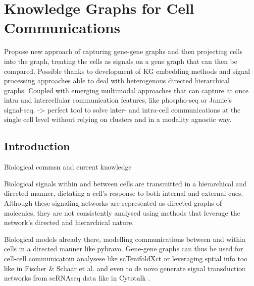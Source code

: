 \chapter{Knowledge Graphs for Cell Communications}
\label{06kg}

Propose new approach of capturing gene-gene graphs and then projecting cells into the graph, treating the cells as signals on a gene graph that can then be compared. 
Possible thanks to development of KG embedding methods and signal processing approaches able to deal with heterogenous directed hierarchical graphs. 
Coupled with emerging multimodal approaches that can capture at once intra and intercellular communication features, like phospho-seq \cite{blair_phospho-seq_2023} or Jamie's signal-seq. -> perfect tool to solve inter- and intra-cell communications at the single cell level without relying on clusters and in a modality agnostic way. 


\section{Introduction}

Biological commsn and current knowledge

Biological signals within and between cells are transmitted in a hierarchical and directed manner, dictating a cell’s response to both internal and external cues. Although these signaling networks are represented as directed graphs of molecules, they are not consistently analysed using methods that leverage the network’s directed and hierarchical nature. 


Biological models already there, modelling communications between and within cells in a directed manner like pybravo\cite{lefebvre_large-scale_2021}. Gene-gene graphs can thus be used for cell-cell communicatoin analysese like scTenifoldXct \cite{yang_sctenifoldxct_2023} or leveraging sptial info too like in Fischer \& Schaar et al. \cite{fischer_modeling_2022} and even to de novo generate signal transduction networks from scRNAseq data like in Cytotalk \cite{hu_cytotalk_2021}.

